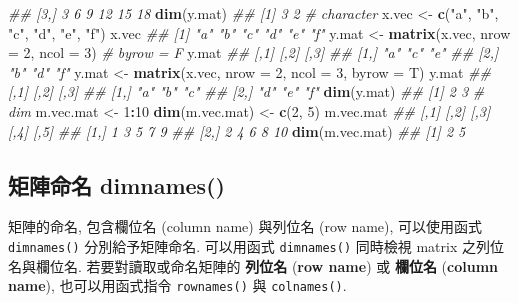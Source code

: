 \documentclass[
]{book}
\newenvironment{Shaded}{\begin{snugshade}}{\end{snugshade}}
\newcommand{\CommentTok}[1]{\textcolor[rgb]{0.56,0.35,0.01}{\textit{#1}}}
\newcommand{\DataTypeTok}[1]{\textcolor[rgb]{0.13,0.29,0.53}{#1}}
\newcommand{\DecValTok}[1]{\textcolor[rgb]{0.00,0.00,0.81}{#1}}
\newcommand{\KeywordTok}[1]{\textcolor[rgb]{0.13,0.29,0.53}{\textbf{#1}}}
\newcommand{\NormalTok}[1]{#1}
\newcommand{\OperatorTok}[1]{\textcolor[rgb]{0.81,0.36,0.00}{\textbf{#1}}}
\newcommand{\StringTok}[1]{\textcolor[rgb]{0.31,0.60,0.02}{#1}}
\begin{document}
\begin{Shaded}
\begin{Highlighting}[]
\CommentTok{\#\# [3,]    3    6    9   12   15   18}
\KeywordTok{dim}\NormalTok{(y.mat)}
\CommentTok{\#\# [1] 3 2}
\CommentTok{\# character}
\NormalTok{x.vec \textless{}{-}}\StringTok{ }\KeywordTok{c}\NormalTok{(}\StringTok{"a"}\NormalTok{, }\StringTok{"b"}\NormalTok{, }\StringTok{"c"}\NormalTok{, }\StringTok{"d"}\NormalTok{, }\StringTok{"e"}\NormalTok{, }\StringTok{"f"}\NormalTok{)}
\NormalTok{x.vec}
\CommentTok{\#\# [1] "a" "b" "c" "d" "e" "f"}
\NormalTok{y.mat \textless{}{-}}\StringTok{ }\KeywordTok{matrix}\NormalTok{(x.vec, }\DataTypeTok{nrow =} \DecValTok{2}\NormalTok{, }\DataTypeTok{ncol =} \DecValTok{3}\NormalTok{) }\CommentTok{\# byrow = F}
\NormalTok{y.mat}
\CommentTok{\#\#      [,1] [,2] [,3]}
\CommentTok{\#\# [1,] "a"  "c"  "e" }
\CommentTok{\#\# [2,] "b"  "d"  "f"}
\NormalTok{y.mat \textless{}{-}}\StringTok{ }\KeywordTok{matrix}\NormalTok{(x.vec,}
                \DataTypeTok{nrow =} \DecValTok{2}\NormalTok{,}
                \DataTypeTok{ncol =} \DecValTok{3}\NormalTok{,}
                \DataTypeTok{byrow =}\NormalTok{ T)}
\NormalTok{y.mat}
\CommentTok{\#\#      [,1] [,2] [,3]}
\CommentTok{\#\# [1,] "a"  "b"  "c" }
\CommentTok{\#\# [2,] "d"  "e"  "f"}
\KeywordTok{dim}\NormalTok{(y.mat)}
\CommentTok{\#\# [1] 2 3}
\CommentTok{\# dim}
\NormalTok{m.vec.mat \textless{}{-}}\StringTok{ }\DecValTok{1}\OperatorTok{:}\DecValTok{10}
\KeywordTok{dim}\NormalTok{(m.vec.mat) \textless{}{-}}\StringTok{ }\KeywordTok{c}\NormalTok{(}\DecValTok{2}\NormalTok{, }\DecValTok{5}\NormalTok{)}
\NormalTok{m.vec.mat}
\CommentTok{\#\#      [,1] [,2] [,3] [,4] [,5]}
\CommentTok{\#\# [1,]    1    3    5    7    9}
\CommentTok{\#\# [2,]    2    4    6    8   10}
\KeywordTok{dim}\NormalTok{(m.vec.mat)}
\CommentTok{\#\# [1] 2 5}
\end{Highlighting}
\end{Shaded}

\hypertarget{ux77e9ux9663ux547dux540d-dimnames}{%
\subsection{矩陣命名 dimnames()}\label{ux77e9ux9663ux547dux540d-dimnames}}

矩陣的命名, 包含欄位名 (column name) 與列位名 (row name),
可以使用函式
\texttt{dimnames()} 分別給予矩陣命名.
可以用函式 \texttt{dimnames()}
同時檢視 matrix 之列位名與欄位名.
若要對讀取或命名矩陣的
\textbf{列位名}
(\textbf{row name})
或
\textbf{欄位名}
(\textbf{column name}),
也可以用函式指令
\texttt{rownames()}
與
\texttt{colnames()}.
\end{document}

